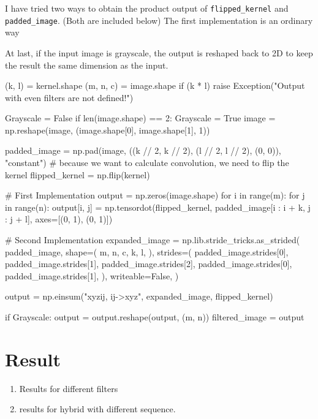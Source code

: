 I have tried two ways to obtain the product output of \verb|flipped_kernel| and \verb|padded_image|. (Both are included below) The first implementation is an ordinary way

At last, if the input image is grayscale, the output is reshaped back to 2D to keep the result the same dimension as the input.
\begin{python}
(k, l) = kernel.shape
(m, n, c) = image.shape
if (k * l) %
    raise Exception("Output with even filters are not defined!")

Grayscale = False
if len(image.shape) == 2:
    Grayscale = True
    image = np.reshape(image, (image.shape[0], image.shape[1], 1))

padded_image = np.pad(image, ((k // 2, k // 2), (l // 2, l // 2), (0, 0)), "constant")
# because we want to calculate convolution, we need to flip the kernel
flipped_kernel = np.flip(kernel)

# First Implementation
output = np.zeros(image.shape)
for i in range(m):
    for j in range(n):
        output[i, j] = np.tensordot(flipped_kernel, padded_image[i : i + k, j : j + l], axes=[(0, 1), (0, 1)])

# Second Implementation
expanded_image = np.lib.stride_tricks.as_strided(
        padded_image,
        shape=(
            m,
            n,
            c,
            k,
            l,
        ),
        strides=(
            padded_image.strides[0],
            padded_image.strides[1],
            padded_image.strides[2],
            padded_image.strides[0],
            padded_image.strides[1],
        ),
        writeable=False,
    )

output = np.einsum("xyzij, ij->xyz", expanded_image, flipped_kernel)

if Grayscale:
    output = output.reshape(output, (m, n))
filtered_image = output
\end{python}
\section*{Result}

\begin{enumerate}
    \item Results for different filters

    \item results for hybrid with different sequence.
\end{enumerate}

